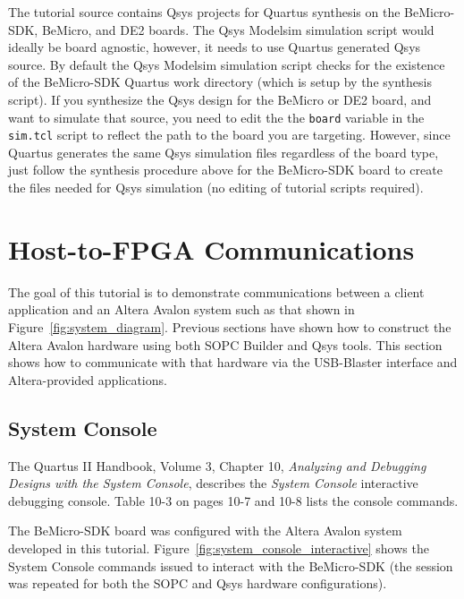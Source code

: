 \documentclass[10pt,twoside]{article}
\begin{document}
The tutorial source contains Qsys projects for Quartus synthesis on 
the BeMicro-SDK, BeMicro, and DE2 boards. The Qsys Modelsim simulation
script would ideally be board agnostic, however, it needs to use
Quartus generated Qsys source. By default the Qsys Modelsim 
simulation script checks for the existence of the BeMicro-SDK Quartus
work directory (which is setup by the synthesis script). If you 
synthesize the Qsys design for the BeMicro or DE2 board, and want
to simulate that source, you need to edit the 
the \verb+board+ variable in the \verb+sim.tcl+ script to
reflect the path to the board you are targeting.
However, since Quartus generates the same Qsys simulation files 
regardless of the board type, just follow the synthesis procedure 
above for the BeMicro-SDK board to create the files needed for 
Qsys simulation (no editing of tutorial scripts required).

\clearpage
\section{Host-to-FPGA Communications}
\label{sec:host_to_fpga_communications}

The goal of this tutorial is to demonstrate communications between
a client application and an Altera Avalon system such as that
shown in Figure~\ref{fig:system_diagram}. Previous sections
have shown how to construct the Altera Avalon hardware using
both SOPC Builder and Qsys tools. This section shows how to 
communicate with that hardware via the USB-Blaster interface
and Altera-provided applications.

\subsection{System Console}
%
The Quartus II Handbook, Volume 3, Chapter 10, {\em Analyzing and
Debugging Designs with the System Console}, describes the 
{\em System Console} interactive debugging console. 
Table 10-3 on pages 10-7 and 10-8 lists the console 
commands\cite{Altera_Quartus_Handbook_2011}.

The BeMicro-SDK board was configured with the Altera Avalon
system developed in this tutorial. 
Figure~\ref{fig:system_console_interactive} shows 
the System Console commands issued to interact with the 
BeMicro-SDK (the session was repeated for both the SOPC and
Qsys hardware configurations).
\end{document}
